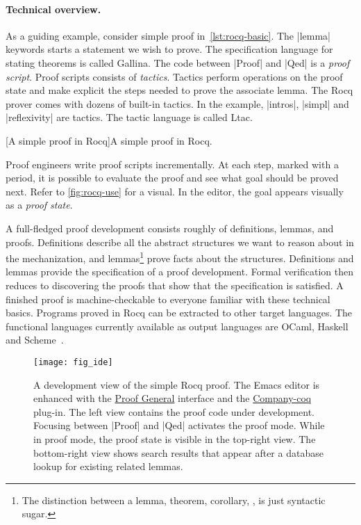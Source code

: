 \paragraph*{Technical overview.}
As a guiding example, consider simple proof in~\autoref{lst:rocq-basic}.
The \pr|lemma| keywords starts a statement we wish to prove.
The specification language for stating theorems is called Gallina.
The code between \pr|Proof| and \pr|Qed| is a \emph{proof script}.
Proof scripts consists of \emph{tactics}.
Tactics perform operations on the proof state and make explicit the steps needed to prove the associate lemma.
The Rocq prover comes with dozens of built-in tactics.
In the example, \pr|intros|, \pr|simpl| and \pr|reflexivity| are tactics.
The tactic language is called Ltac.

\begin{center}
\begin{minipage}{\textwidth}
\captionsetup{type=lstlisting}
[A simple proof in Rocq]{A simple proof in Rocq.}
\label{lst:rocq-basic}
\end{minipage}
\end{center}

Proof engineers write proof scripts incrementally.
At each step, marked with a period, it is possible to evaluate the proof and see what goal should be proved next.
Refer to \autoref{fig:rocq-use} for a visual.
In the editor, the goal appears visually as a \emph{proof state}.

A full-fledged proof development consists roughly of definitions, lemmas, and proofs.
Definitions describe all the abstract structures we want to reason about in the mechanization,
and lemmas\footnote{The distinction between a lemma, theorem, corollary, \etc, is just syntactic sugar.}
prove facts about the structures.
Definitions and lemmas provide the specification of a proof development.
Formal verification then reduces to discovering the proofs that show that the specification is satisfied.
A finished proof is machine-checkable to everyone familiar with these technical basics.
Programs proved in Rocq can be extracted to other target languages.
The functional languages currently available as output languages are
OCaml, Haskell and Scheme~\cite{rocqdoc}.

\begin{figure}[ht]
\begin{center}
\texttt{[image: fig\_ide]}
\end{center}
\caption[Development view of the simple Rocq proof]
{A development view of the simple Rocq proof.
The Emacs editor is enhanced with the \href{https://proofgeneral.github.io/}{Proof General} interface
and the \href{https://github.com/cpitclaudel/company-coq}{Company-coq} plug-in.
The left view contains the proof code under development.
Focusing between \pr|Proof| and \pr|Qed| activates the {proof mode}.
While in proof mode, the {proof state} is visible in the top-right view.
The bottom-right view shows search results that appear after a database lookup for existing related lemmas.}
\label{fig:rocq-use}
\end{figure}

